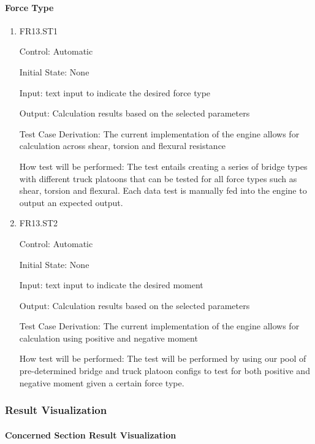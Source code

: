 \documentclass[12pt, titlepage]{article}
\begin{document}
\paragraph{Force Type}

\begin{enumerate}

\item{FR13.ST1\\}

Control: Automatic
					
Initial State: None
					
Input: text input to indicate the desired force type  
					
Output: Calculation results based on the selected parameters 

Test Case Derivation: The current implementation of the engine allows for calculation across shear, torsion and flexural resistance

How test will be performed: The test entails creating a series of bridge types with different truck platoons that can be tested for all force types such as shear, torsion and flexural. Each data test is manually fed into the engine to output an expected output. 
					
\item{FR13.ST2\\}

Control: Automatic
					
Initial State: None
					
Input: text input to indicate the desired moment  
					 
Output: Calculation results based on the selected parameters 

Test Case Derivation: The current implementation of the engine allows for calculation using positive and negative moment 

How test will be performed: The test will be performed by using our pool of pre-determined bridge and truck platoon configs to test for both positive and negative moment given a certain force type. 

\end{enumerate}

\subsubsection{Result Visualization}

\paragraph{Concerned Section Result Visualization}
\end{document}
